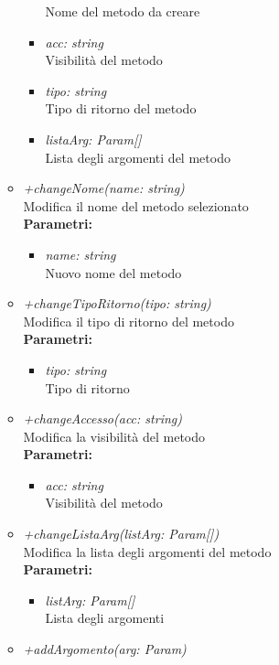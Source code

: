 \begin{itemize}
\begin{itemize}
\begin{itemize}
    			Nome del metodo da creare
    			\item \emph{acc: string}\\
    			Visibilità del metodo
    			\item \emph{tipo: string}\\
    			Tipo di ritorno del metodo
    			\item \emph{listaArg: Param[]}\\
    			Lista degli argomenti del metodo
    		\end{itemize}
    		\item \emph{+changeNome(name: string)}\\
    		Modifica il nome del metodo selezionato\\
    		\textbf{Parametri:}
    		\begin{itemize}
    			\item \emph{name: string}\\
    			Nuovo nome del metodo
    		\end{itemize}
    		\item \emph{+changeTipoRitorno(tipo: string)}\\
    		Modifica il tipo di ritorno del metodo\\
    		\textbf{Parametri:}
    		\begin{itemize}
    			\item \emph{tipo: string}\\
    			Tipo di ritorno
    		\end{itemize}
    		\item \emph{+changeAccesso(acc: string)}\\
    		Modifica la visibilità del metodo\\
    		\textbf{Parametri:}
    		\begin{itemize}
    			\item \emph{acc: string}\\
    			Visibilità del metodo
    		\end{itemize}
    		\item \emph{+changeListaArg(listArg: Param[])}\\
    		Modifica la lista degli argomenti del metodo\\
    		\textbf{Parametri:}
    		\begin{itemize}
    			\item \emph{listArg: Param[]}\\
    			Lista degli argomenti
    		\end{itemize}
    		\item \emph{+addArgomento(arg: Param)}\\

\end{itemize}
\end{itemize}
